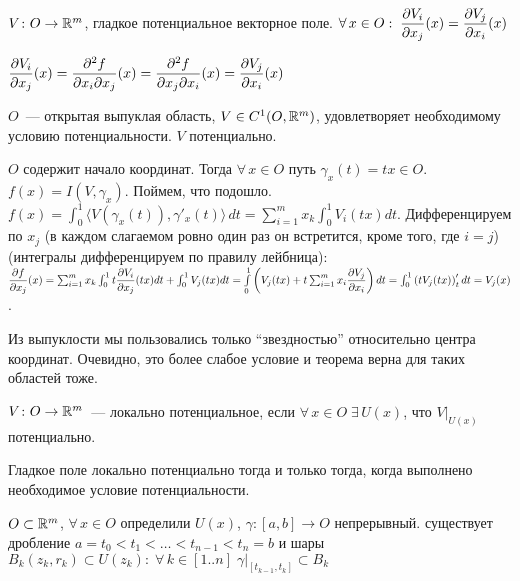 \begin{Theorem*}
	$V\colon O\to\mathbb{R}^{m}$, гладкое потенциальное векторное поле. \THEN $\forall\,x\in O:\;\dfrac{\partial V_i}{\partial x_j}(x)=\dfrac{\partial V_j}{\partial x_i}(x)$
\end{Theorem*}

\begin{Proof}
	$\dfrac{\partial V_i}{\partial x_j}(x)=\dfrac{\partial^2 f}{\partial x_i\partial x_j}(x)=\dfrac{\partial^2 f}{\partial x_j\partial x_i}(x)=\dfrac{\partial V_j}{\partial x_i}(x)$
\end{Proof}

\begin{Theorem*}
	$O$~--- открытая выпуклая область, $V\in C^1(O,\mathbb{R}^{m})$, удовлетворяет необходимому условию потенциальности. \THEN $V$ потенциально.
\end{Theorem*}

\begin{Proof}
	$O$ содержит начало координат. Тогда $\forall\,x\in O$ путь $\gamma_x(t)=tx\in O$. $f(x)=I(V,\gamma_x)$. Поймем, что подошло. $f(x)=\int_0^1\langle V(\gamma_x(t)),\gamma'_x(t)\rangle\,dt=\sum_{i=1}^m x_k\int_0^1 V_i(t x)dt$.
	Дифференцируем по $x_j$ (в каждом слагаемом ровно один раз он встретится, кроме того, где $i=j$) (интегралы дифференцируем по правилу лейбница): $\dfrac{\partial f}{\partial x_j}(x)=\sum_{i=1}^m x_k\int_0^1 t\dfrac{\partial V_i}{\partial x_j}(t x)dt + \int_0^1 V_j(tx)dt=\int\limits_0^1 \left(V_j(t x)+t\sum_{i=1}^m x_i\dfrac{\partial V_j}{\partial x_i}\right)dt=\int_0^1\left(t V_j(t x)\right)'_t dt=V_j(x)$.
\end{Proof}

\begin{NB*}
	Из выпуклости мы пользовались только ``звездностью'' относительно центра координат. Очевидно, это более слабое условие и теорема верна для таких областей тоже.
\end{NB*}

\begin{defin*}
	$V\colon O\to\mathbb{R}^{m}$~--- локально потенциальное, если $\forall\,x\in O\;\exists\,U(x)$, что $V|_{U(x)}$ потенциально.
\end{defin*}

\begin{Corollary*}
	Гладкое поле локально потенциально тогда и только тогда, когда выполнено необходимое условие потенциальности.
\end{Corollary*}

\begin{Theorem*}
	$O\subset\mathbb{R}^{m}$, $\forall\,x\in O$ определили $U(x)$, $\gamma\colon[a,b]\to O$ непрерывный. \THEN существует дробление $a=t_0<t_1<\ldots<t_{n-1}<t_n=b$ и шары $B_k(z_k,r_k)\subset U(z_k):\;\forall\,k\in[1..n]\;\gamma|_{[t_{k-1},t_k]}\subset B_k$
\end{Theorem*}

